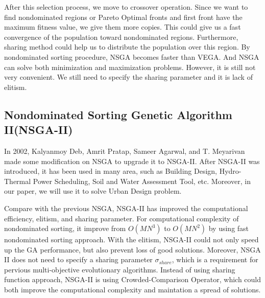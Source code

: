 After this selection process, we move to crossover operation. Since we want to find nondominated regions or Pareto Optimal fronts and first front have the maximum fitness value, we give them more copies. This could give us a fast convergence of the population toward nondominated regions. Furthermore, sharing method could help us to distribute the population over this region. By nondominated sorting procedure, NSGA becomes faster than VEGA. And NSGA can solve both minimization and maximization problems. However, it is still not very convenient. We still need to specify the sharing parameter and it is lack of elitism.

\subsection{Nondominated Sorting Genetic Algorithm II(NSGA-II)}
In 2002, Kalyanmoy Deb, Amrit Pratap, Sameer Agarwal, and T. Meyarivan made some modification on NSGA to upgrade it to NSGA-II\cite{NSGA_II}. After NSGA-II was introduced, it has been used in many area, such as Building Design\cite{Magnier_2010_Multiobjective}, Hydro-Thermal Power Scheduling\cite{Deb_2007_Dynamic}, Soil and Water Assessment Tool\cite{Bekele_2007_Multi}, etc. Moreover, in our paper, we will use it to solve Urban Design problem. 

Compare with the previous NSGA, NSGA-II has improved the computational efficiency, elitism, and sharing parameter\cite{NSGA_II}. For computational complexity of nondominated sorting, it improve from \(O(MN^{3})\) to \(O(MN^{2})\) by using fast nondominated sorting approach\cite{NSGA_II}. With the elitism, NSGA-II could not only speed up the GA performance, but also prevent loss of good solutions. Moreover, NSGA II does not need to specify a sharing parameter \(\sigma_{share}\), which is a requirement for pervious multi-objective evolutionary algorithms. Instead of using sharing function approach, NSGA-II is using Crowded-Comparison Operator, which could both improve the computational complexity and maintation a spread of solutions.


